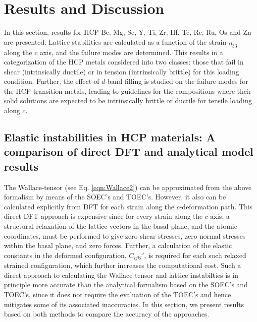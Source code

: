\documentclass[showpacs,aps,floatfix,prb,reprint,superscriptaddress]{revtex4-1}
\begin{document}
\section{Results and Discussion}
In this section, results for HCP Be, Mg, Sc, Y, Ti, Zr, Hf, Tc, Re, Ru, Os and Zn are presented. Lattice stabilities are calculated as a function of the strain $\eta_{33}$ along the $c$ axis, and the failure modes are determined. This results in a categorization of the HCP metals considered into two classes: those that fail in shear (intrinsically ductile) or in tension (intrinsically brittle) for this loading condition. Further, the effect of $d$-band filling is studied on the failure modes for the HCP transition metals, leading to guidelines for the compositions where their solid solutions are expected to be intrinsically brittle or ductile for tensile loading along $c$.

\subsection{Elastic instabilities in HCP materials: A comparison of direct DFT and analytical model results}
The Wallace-tensor (see Eq. \ref{eqn:Wallace2}) can be approximated from the above formalism by means of the SOEC's and TOEC's. However, it also can be calculated explicitly from DFT for each strain along the $c$-deformation path. This direct DFT approach is expensive since for every strain along the $c$-axis, a structural relaxation of the lattice vectors in the basal plane, and the atomic coordinates, must be performed to give zero shear stresses, zero normal stresses within the basal plane, and zero forces. Further, a calculation of the elastic constants in the deformed configuration, $C_{ijkl}'$, is required for each such relaxed strained configuration, which further increases the computational cost.  Such a direct approach to calculating the Wallace tensor and lattice instabilties is in principle more accurate than the analytical formalism based on the SOEC's and TOEC's, since it does not require the evaluation of the TOEC's and hence mitigates some of its associated inaccuracies. In this section, we present results based on both methods to compare the accuracy of the approaches.
\end{document}
